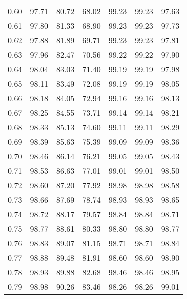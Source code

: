 \begin{tabular}{|c|c|c|c|c|c|c|}
      0.60 &     97.71 &     80.72 &      68.02 &   99.23 &      99.23 &         97.63 \\
      0.61 &     97.80 &     81.33 &      68.90 &   99.23 &      99.23 &         97.73 \\
      0.62 &     97.88 &     81.89 &      69.71 &   99.23 &      99.23 &         97.81 \\
      0.63 &     97.96 &     82.47 &      70.56 &   99.22 &      99.22 &         97.90 \\
      0.64 &     98.04 &     83.03 &      71.40 &   99.19 &      99.19 &         97.98 \\
      0.65 &     98.11 &     83.49 &      72.08 &   99.19 &      99.19 &         98.05 \\
      0.66 &     98.18 &     84.05 &      72.94 &   99.16 &      99.16 &         98.13 \\
      0.67 &     98.25 &     84.55 &      73.71 &   99.14 &      99.14 &         98.21 \\
      0.68 &     98.33 &     85.13 &      74.60 &   99.11 &      99.11 &         98.29 \\
      0.69 &     98.39 &     85.63 &      75.39 &   99.09 &      99.09 &         98.36 \\
      0.70 &     98.46 &     86.14 &      76.21 &   99.05 &      99.05 &         98.43 \\
      0.71 &     98.53 &     86.63 &      77.01 &   99.01 &      99.01 &         98.50 \\
      0.72 &     98.60 &     87.20 &      77.92 &   98.98 &      98.98 &         98.58 \\
      0.73 &     98.66 &     87.69 &      78.74 &   98.93 &      98.93 &         98.65 \\
      0.74 &     98.72 &     88.17 &      79.57 &   98.84 &      98.84 &         98.71 \\
      0.75 &     98.77 &     88.61 &      80.33 &   98.80 &      98.80 &         98.77 \\
      0.76 &     98.83 &     89.07 &      81.15 &   98.71 &      98.71 &         98.84 \\
      0.77 &     98.88 &     89.48 &      81.91 &   98.60 &      98.60 &         98.90 \\
      0.78 &     98.93 &     89.88 &      82.68 &   98.46 &      98.46 &         98.95 \\
      0.79 &     98.98 &     90.26 &      83.46 &   98.26 &      98.26 &         99.01 \\

\end{tabular}
